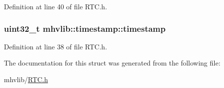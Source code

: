 Definition at line 40 of file R\-T\-C.\-h.

\hypertarget{structmhvlib_1_1timestamp_a901b5c2408fef1697c9e9073e3c25bc8}{
\subsubsection[{timestamp}]{\setlength{\rightskip}{0pt plus 5cm}uint32\-\_\-t mhvlib\-::timestamp\-::timestamp}}\label{structmhvlib_1_1timestamp_a901b5c2408fef1697c9e9073e3c25bc8}


Definition at line 38 of file R\-T\-C.\-h.



The documentation for this struct was generated from the following file\-:\begin{DoxyCompactItemize}
\item 
mhvlib/\hyperlink{_r_t_c_8h}{R\-T\-C.\-h}\end{DoxyCompactItemize}
